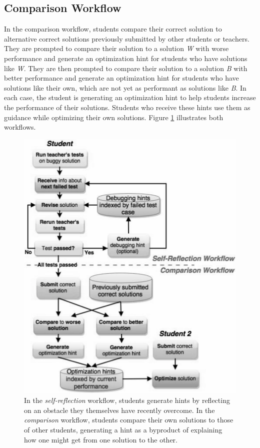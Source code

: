 \subsection{Comparison Workflow} 

In the comparison workflow, students compare their correct solution to alternative correct solutions previously submitted by other students or teachers. They are prompted to compare their solution to a solution \textit{W} with worse performance and generate an optimization hint for students who have solutions like \textit{W}. They are then prompted to compare their solution to a solution \textit{B} with better performance and generate an optimization hint for students who have solutions like their own, which are not yet as performant as solutions like \textit{B}. In each case, the student is generating an optimization hint to help students increase the performance of their solutions. Students who receive these hints use them as guidance while optimizing their own solutions. Figure \ref{fig:workflow} illustrates both workflows.

\begin{figure}
\centering
\includegraphics[width=0.75\columnwidth]{Body/figures/classoverflow/CombinedWorkflow_grey.pdf}
\caption{In the \textit{self-reflection} workflow, students generate hints by reflecting on an obstacle they themselves have recently overcome. In the \textit{comparison} workflow, students compare their own solutions to those of other students, generating a hint as a byproduct of explaining how one might get from one solution to the other.}
\label{fig:workflow}
\end{figure}

